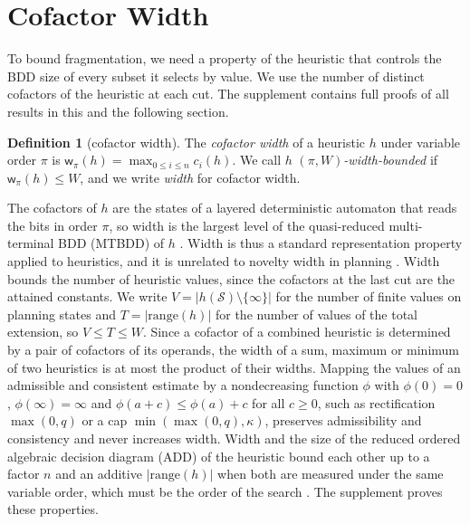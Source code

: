 \documentclass[letterpaper]{article}
\newcommand{\states}{\ensuremath{\mathcal{S}}}
\newcommand{\width}{\ensuremath{\mathsf{w}}}
\newcommand{\cutcount}[2]{\ensuremath{c_{#1}(#2)}}
\newcommand{\values}{\ensuremath{V}}
\newcommand{\hrange}{\ensuremath{\mathrm{range}}}
\theoremstyle{plain}
\theoremstyle{definition}
\newtheorem{definition}{Definition}
\theoremstyle{remark}
\begin{document}
\section{Cofactor Width}

To bound fragmentation, we need a property of the heuristic that controls the BDD size of every subset it selects by value.
We use the number of distinct cofactors of the heuristic at each cut.
The supplement contains full proofs of all results in this and the following section.

\begin{definition}[cofactor width]
\label{def-width}
The \emph{cofactor width} of a heuristic $h$ under variable order $\pi$ is $\width_\pi(h) = \max_{0 \leq i \leq n} \cutcount{i}{h}$.
We call $h$ \emph{$(\pi,W)$-width-bounded} if $\width_\pi(h) \leq W$, and we write \emph{width} for cofactor width.
\end{definition}

The cofactors of $h$ are the states of a layered deterministic automaton that reads the bits in order $\pi$, so width is the largest level of the quasi-reduced multi-terminal BDD (MTBDD) of $h$ \citep[Thm.~3.2.2; Sec.~9.2]{wegener-2000}.
Width is thus a standard representation property applied to heuristics, and it is unrelated to novelty width in planning \citep{lipovetzky-geffner-ecai2012}.
Width bounds the number of heuristic values, since the cofactors at the last cut are the attained constants.
We write $\values=|h(\states)\setminus\{\infty\}|$ for the number of finite values on planning states and $T=|\hrange(h)|$ for the number of values of the total extension, so $\values\leq T\leq W$.
Since a cofactor of a combined heuristic is determined by a pair of cofactors of its operands, the width of a sum, maximum or minimum of two heuristics is at most the product of their widths.
Mapping the values of an admissible and consistent estimate by a nondecreasing function $\phi$ with $\phi(0)=0$, $\phi(\infty)=\infty$ and $\phi(a+c)\leq\phi(a)+c$ for all $c\geq0$, such as rectification $\max(0,q)$ or a cap $\min(\max(0,q),\kappa)$, preserves admissibility and consistency and never increases width.
Width and the size of the reduced ordered algebraic decision diagram (ADD) of the heuristic \citep{bahar-et-al-iccad1993} bound each other up to a factor $n$ and an additive $|\hrange(h)|$ when both are measured under the same variable order, which must be the order of the search \citep{kissmann-hoffmann-jair2014}.
The supplement proves these properties.
\end{document}
